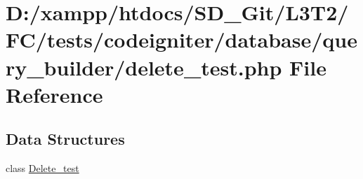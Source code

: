 \hypertarget{tests_2codeigniter_2database_2query__builder_2delete__test_8php}{}\section{D\+:/xampp/htdocs/\+S\+D\+\_\+\+Git/\+L3\+T2/\+F\+C/tests/codeigniter/database/query\+\_\+builder/delete\+\_\+test.php File Reference}
\label{tests_2codeigniter_2database_2query__builder_2delete__test_8php}
\subsection*{Data Structures}
\begin{DoxyCompactItemize}
\item 
class \hyperlink{class_delete__test}{Delete\+\_\+test}
\end{DoxyCompactItemize}
